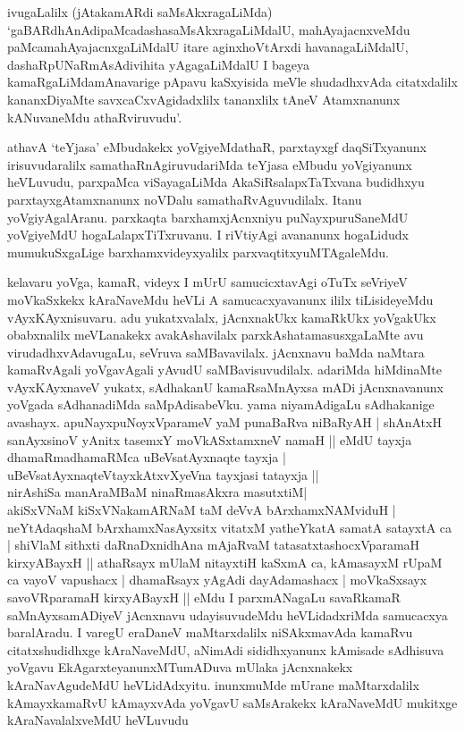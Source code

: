 \begin{artha}
ivugaLalilx (jAtakamARdi saMsAkxragaLiMda) `gaBARdhAnAdipaMcadashasaMsAkxragaLiMdalU, mahAyajacnxveMdu paMcamahAyajacnxgaLiMdalU itare aginxhoVtArxdi havanagaLiMdalU, dashaRpUNaRmAsAdivihita yAgagaLiMdalU I bageya kamaRgaLiMda\break mAnavarige pApavu kaSxyisida meVle shudadhxvAda citatxdalilx kananxDiyaMte savxcaCxvAgidadxlilx tananxlilx tAneV Atamxnanunx kANuvaneMdu athaRviruvudu'. 

athavA `teYjasa' eMbudakekx yoVgiyeMdathaR, parxtayxgf daqSiTxyanunx irisuvudaralilx samathaRnAgiruvudariMda teYjasa eMbudu yoVgiyanunx heVLuvudu, parxpaMca viSayagaLiMda AkaSiRsalapxTaTxvana budidhxyu parxtayxgAtamxnanunx noVDalu samathaRvAguvudilalx. Itanu yoVgiyAgalAranu. parxkaqta barxhamxjAcnxniyu puNayxpuruSaneMdU yoVgiyeMdU hogaLalapxTiTxruvanu. I riVtiyAgi avananunx hogaLidudx mumukuSxgaLige barxhamxvideyxyalilx parxvaqtitxyuMTAgaleMdu. 

kelavaru yoVga, kamaR, videyx I mUrU samucicxtavAgi oTuTx seVriyeV moVkaSxkekx kAraNaveMdu heVLi A samucacxyavanunx ililx tiLisideyeMdu vAyxKAyxnisuvaru. adu yukatxvalalx, jAcnxnakUkx kamaRkUkx yoVgakUkx obabxnalilx meVLanakekx avakAshavilalx parxkAshatamasusxgaLaMte avu virudadhxvAdavugaLu, seVruva saMBavavilalx. jAcnxnavu baMda naMtara kamaRvAgali yoVgavAgali yAvudU saMBavisuvudilalx. adariMda hiMdinaMte vAyxKAyxnaveV yukatx, sAdhakanU kamaRsaMnAyxsa mADi jAcnxnavanunx yoVgada sAdhanadiMda saMpAdisabeVku. yama niyamAdigaLu sAdhakanige avashayx. \ndash  apuNayxpuNoyxVparameV yaM punaBaRva niBaRyAH | shAnAtxH sanAyxsinoV yAnitx tasemxY moVkASxtamxneV namaH || eMdU tayxja dhamaRmadhamaRMca uBeVsatAyxnaqte tayxja | uBeVsatAyxnaqteVtayxkAtxvXyeVna tayxjasi tatayxja ||\\
nirAshiSa manAraMBaM ninaRmasAkxra masutxtiM|\\
akiSxVNaM kiSxVNakamARNaM taM deVvA bArxhamxNAMviduH |\\
neYtAdaqshaM bArxhamxNasAyxsitx vitatxM yatheYkatA samatA satayxtA ca | shiVlaM sithxti daRnaDxnidhAna mAjaRvaM tatasatxtashocxVparamaH kirxyABayxH || athaRsayx mUlaM nitayxtiH kaSxmA ca, kAmasayxM rUpaM ca vayoV vapushacx | dhamaRsayx yAgAdi dayAdamashacx | moVkaSxsayx savoVRparamaH kirxyABayxH || eMdu I parxmANagaLu savaRkamaR saMnAyxsamADiyeV jAcnxnavu udayisuvudeMdu heVLidadxriMda samucacxya baralAradu. I varegU eraDaneV maMtarxdalilx niSAkxmavAda kamaRvu citatxshudidhxge kAraNaveMdU, aNimAdi sididhxyanunx kAmisade sAdhisuva yoVgavu EkAgarxteyanunxMTumADuva mUlaka jAcnxnakekx kAraNavAgudeMdU heVLidAdxyitu. inunxmuMde mUrane maMtarxdalilx kAmayxkamaRvU kAmayxvAda yoVgavU saMsArakekx kAraNaveMdU mukitxge kAraNavalalxveMdU heVLuvudu\ndash 
\end{artha}

